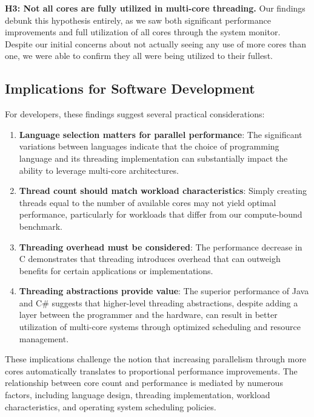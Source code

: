 \documentclass[12pt,a4paper]{article}
\begin{document}
\textbf{H3: Not all cores are fully utilized in multi-core threading.}
Our findings debunk this hypothesis entirely, as we saw both significant performance improvements and full utilization of all cores through the system monitor. Despite our initial concerns about not actually seeing any use of more cores than one, we were able to confirm they all were being utilized to their fullest.

\subsection{Implications for Software Development}

For developers, these findings suggest several practical considerations:

\begin{enumerate}
    \item \textbf{Language selection matters for parallel performance}: The significant variations between languages indicate that the choice of programming language and its threading implementation can substantially impact the ability to leverage multi-core architectures.
    
    \item \textbf{Thread count should match workload characteristics}: Simply creating threads equal to the number of available cores may not yield optimal performance, particularly for workloads that differ from our compute-bound benchmark.
    
    \item \textbf{Threading overhead must be considered}: The performance decrease in C demonstrates that threading introduces overhead that can outweigh benefits for certain applications or implementations.
    
    \item \textbf{Threading abstractions provide value}: The superior performance of Java and C\# suggests that higher-level threading abstractions, despite adding a layer between the programmer and the hardware, can result in better utilization of multi-core systems through optimized scheduling and resource management.
\end{enumerate}

These implications challenge the notion that increasing parallelism through more cores automatically translates to proportional performance improvements. The relationship between core count and performance is mediated by numerous factors, including language design, threading implementation, workload characteristics, and operating system scheduling policies.
\end{document}
